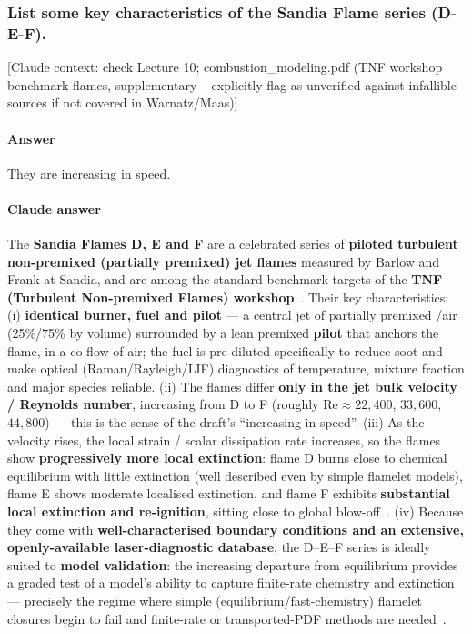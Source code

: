 \subsubsection{List some key characteristics of the Sandia Flame series (D-E-F).}

{\color{gray}\footnotesize [Claude context: check Lecture 10; combustion\_modeling.pdf (TNF workshop benchmark flames, supplementary -- explicitly flag as unverified against infallible sources if not covered in Warnatz/Maas)]}

\paragraph{Answer}

They are increasing in speed.

{\color{istblue}
\paragraph{Claude answer}
The \textbf{Sandia Flames D, E and F} are a celebrated series of \textbf{piloted turbulent non-premixed (partially premixed) jet flames} measured by Barlow and Frank at Sandia, and are among the standard benchmark targets of the \textbf{TNF (Turbulent Non-premixed Flames) workshop}~\cite{barlowfrank1998sandia,lecture10}. Their key characteristics: (i) \textbf{identical burner, fuel and pilot} --- a central jet of partially premixed /air (25\%/75\% by volume) surrounded by a lean premixed \textbf{pilot} that anchors the flame, in a co-flow of air; the fuel is pre-diluted specifically to reduce soot and make optical (Raman/Rayleigh/LIF) diagnostics of temperature, mixture fraction and major species reliable. (ii) The flames differ \textbf{only in the jet bulk velocity / Reynolds number}, increasing from D to F (roughly $\mathrm{Re}\approx 22{,}400$, $33{,}600$, $44{,}800$) --- this is the sense of the draft's ``increasing in speed''. (iii) As the velocity rises, the local strain / scalar dissipation rate increases, so the flames show \textbf{progressively more local extinction}: flame D burns close to chemical equilibrium with little extinction (well described even by simple flamelet models), flame E shows moderate localised extinction, and flame F exhibits \textbf{substantial local extinction and re-ignition}, sitting close to global blow-off~\cite{lecture9,lecture10}. (iv) Because they come with \textbf{well-characterised boundary conditions and an extensive, openly-available laser-diagnostic database}, the D--E--F series is ideally suited to \textbf{model validation}: the increasing departure from equilibrium provides a graded test of a model's ability to capture finite-rate chemistry and extinction --- precisely the regime where simple (equilibrium/fast-chemistry) flamelet closures begin to fail and finite-rate or transported-PDF methods are needed~\cite{veynante2002turbulent,lecture10}.
}






